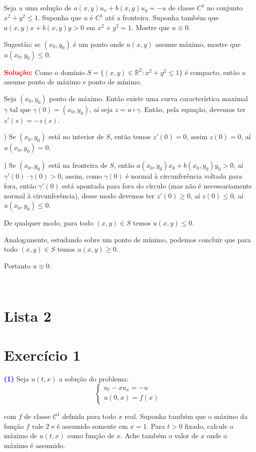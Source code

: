 \documentclass[11pt,a4paper]{article}
\newcommand{\exercicio}[1]{\section*{Exercício #1} \textcolor{blue}{\bf(#1)}}
\newcommand{\solucao}[1]{\begin{mdframed}[style=MyFrame]
\textbf{\textcolor{red}{Solução:}} #1
\end{mdframed}\textcolor{white}{Oi} \newline}
\begin{document}
Seja $u$ uma solução de $a(x, y)u_x +b(x, y)u_y = -u$ de classe $C^{1}$ no conjunto $x^2 + y^2 \le 1.$ Suponha que $u$ é $C^{1}$ até a fronteira. Suponha também que $a(x, y)x + b(x, y)y > 0$ em $x^2 + y^2 = 1.$ Mostre que $u \equiv 0.$

\textsf{Sugestão:} se $(x_0, y_0)$ é um ponto onde $u(x, y)$ assume máximo, mostre que $u(x_0, y_0) \le 0.$

\solucao{
Como o domínio $S=\{(x,y)\in\mathbb{R}^2:x^2+y^2\leq 1\}$ é compacto, então $u$ assume ponto de máximo e ponto de mínimo.

\medskip
\noindent
Seja $(x_0,y_0)$ ponto de máximo. Então existe uma curva característica maximal $\gamma$ tal que $\gamma(0)=(x_0,y_0)$, aí seja $z=u\circ \gamma$. Então, pela equação, devemos ter $z'(s)=-z(s)$.

\medskip
\noindent
1) Se $(x_0,y_0)$ está no interior de $S$, então temos $z'(0)=0$, assim $z(0)=0$, aí $u(x_0,y_0)=0$.

\medskip
\noindent
2) Se $(x_0,y_0)$ está na fronteira de $S$, então $a(x_0,y_0)x_0+b(x_0,y_0)y_0>0$, aí $\gamma'(0)\cdot\gamma(0)>0$, assim, como $\gamma(0)$ é normal à circunferência voltada para fora, então $\gamma'(0)$ está apontada para fora do círculo (mas não é necessariamente normal à circunferência), desse modo devemos ter $z'(0)\geq 0$, aí $z(0)\leq 0$, aí $u(x_0,y_0)\leq 0$.

\medskip
\noindent
De qualquer modo, para todo $(x,y)\in S$ temos $u(x,y)\leq 0$.

\medskip
\noindent
Analogamente, estudando sobre um ponto de mínimo, podemos concluir que para todo $(x,y)\in S$ temos $u(x,y)\geq 0$.

\medskip
\noindent
Portanto $u\equiv 0$.

}

\section{\textcolor{Floresta}{Lista 2}}

\exercicio{1}
Seja $u(t, x)$ a solução do problema:
\[
\left\{\begin{array}{c}
u_t -xu_x = -u \\
u(0, x) = f(x)
\end{array}
\right.
\]

\noindent
com $f$ de classe $\mathcal{C}^1$ defnida para todo $x$ real. Suponha também que o máximo
da função $f$ vale $2$ e é assumido somente em $x = 1$. Para $t > 0$ fixado, calcule
o máximo de $u(t, x)$ como função de $x$. Ache também o valor de $x$ onde o
máximo é assumido.
\end{document}
